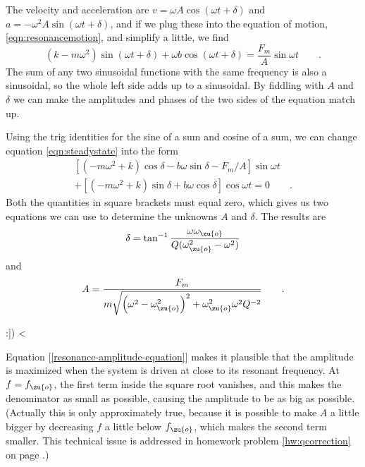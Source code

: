         The velocity and
        acceleration are $v=\omega{}A\cos(\omega  t+\delta)$ and
        $a=-\omega^2A\sin(\omega t+\delta)$, and if we plug these into the equation
        of motion, \eqref{eqn:resonancemotion}, and simplify a little, we find
        \begin{equation}\label{eqn:steadystate}
                (k-m\omega^2)\sin (\omega t+\delta)
                         +\omega b \cos (\omega t+\delta) 
                        = \frac{F_m}{A} \sin \omega t \qquad .
        \end{equation}
        The sum of any two sinusoidal functions with the same frequency is also
        a sinusoidal, so the whole left side adds up to a sinusoidal. By fiddling with
        $A$ and $\delta$ we can make the amplitudes and phases of the two sides
        of the equation match up.

	Using the trig identities for the sine of a sum
	and cosine of a sum, we can change equation \eqref{eqn:steadystate}
        into the form
	\begin{gather*}
		 \left[(-m\omega^2+k)\cos\delta-b\omega\sin\delta-F_m/A\right]\sin\omega t \\
		+  \left[(-m\omega^2+k)\sin\delta+b\omega\cos\delta\right]\cos\omega t
			= 0 \qquad .
	\end{gather*}
	Both the quantities in square brackets must equal zero, which gives us two
	equations we can use to determine the unknowns $A$ and $\delta$. 
	The results are
	\begin{equation}
		\delta = \tan^{-1}\frac{\omega\omega_\zu{o}}
					{Q(\omega_\zu{o}^2-\omega^2)} \\
	\end{equation}
        and
	\begin{equation}\label{resonance-amplitude-equation}
		A = \frac{F_m}{m\sqrt{\left(\omega^2-\omega_\zu{o}^2\right)^2
				+\omega_\zu{o}^2\omega^2Q^{-2}}} \qquad .
	\end{equation}
\label{resonance-amplitude}

:])
<%

Equation [\ref{resonance-amplitude-equation}] makes it plausible that the amplitude is maximized
when the system is driven at close to its resonant frequency. At
$f=f_\zu{o}$, the first term inside the square root vanishes,
and this makes the denominator as small as possible, causing
the amplitude to be as big as possible. (Actually this is
only approximately true, because it is possible to make $A$
a little bigger by decreasing $f$ a little below $f_\zu{o}$,
which makes the second term smaller. This technical issue is
addressed in homework problem \ref{hw:qcorrection} on page 
\pageref{hw:qcorrection}.)

